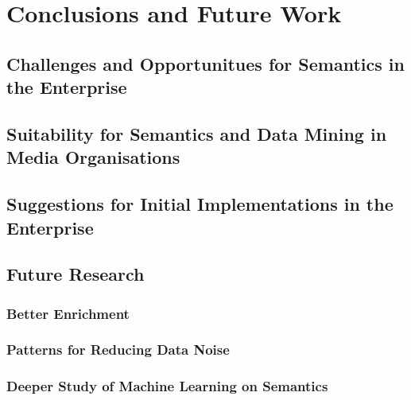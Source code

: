 \chapter{Conclusions and Future Work}

\section{Challenges and Opportunitues for Semantics in the Enterprise}

\section{Suitability for Semantics and Data Mining in Media Organisations}

\section{Suggestions for Initial Implementations in the Enterprise}

\section{Future Research}
\subsection{Better Enrichment}
\subsection{Patterns for Reducing Data Noise}
\subsection{Deeper Study of Machine Learning on Semantics}

